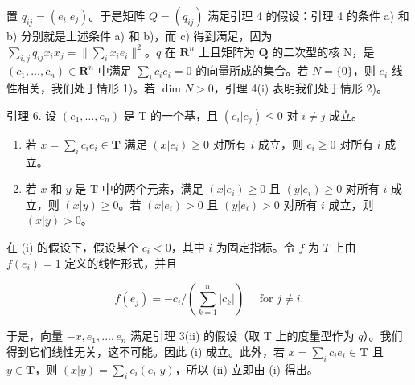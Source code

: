 置 \(q_{ij} = (e_i|e_j)\)。于是矩阵 \(Q = (q_{ij})\) 满足引理 4 的假设：引理 4 的条件 a) 和 b) 分别就是上述条件 a) 和 b)，而 c) 得到满足，因为 \(\sum_{i,j} q_{ij} x_i x_j = \|\sum_{i} x_i e_i\|^2\)。\(q\) 在 \(\mathbf{R}^n\) 上且矩阵为 \(\mathbf{Q}\) 的二次型的核 N，是 \((c_1, \ldots, c_n) \in \mathbf{R}^n\) 中满足 \(\sum_{i} c_i e_i = 0\) 的向量所成的集合。若 \(N = \{0\}\)，则 \(e_i\) 线性相关，我们处于情形 1)。若 \(\dim N > 0\)，引理 4(i) 表明我们处于情形 2)。

引理 6. 设 \((e_1, \ldots, e_n)\) 是 T 的一个基，且 \((e_i | e_j) \leqslant 0\) 对 \(i \neq j\) 成立。

\begin{enumerate}
\def\labelenumi{(\roman{enumi})}
\item
若 \(x = \sum_{i} c_i e_i \in \mathbf{T}\) 满足 \((x|e_i) \geqslant 0\) 对所有 \(i\) 成立，则 \(c_i \geqslant 0\) 对所有 \(i\) 成立。
\item
若 \(x\) 和 \(y\) 是 \(\mathrm{T}\) 中的两个元素，满足 \((x|e_i) \geqslant 0\) 且 \((y|e_i) \geqslant 0\) 对所有 \(i\) 成立，则 \((x|y) \geqslant 0\)。若 \((x|e_i) > 0\) 且 \((y|e_i) > 0\) 对所有 \(i\) 成立，则 \((x|y) > 0\)。
\end{enumerate}

在 (i) 的假设下，假设某个 \(c_{i} < 0\)，其中 \(i\) 为固定指标。令 \(f\) 为 \(T\) 上由 \(f(e_{i}) = 1\) 定义的线性形式，并且

\[
f \left(e _ {j}\right) = - c _ {i} / \left(\sum_ {k = 1} ^ {n} \left| c _ {k} \right|\right) \quad \text { for } j \neq i.
\]

于是，向量 \(-x, e_1, \ldots, e_n\) 满足引理 3(ii) 的假设（取 T 上的度量型作为 \(q\)）。我们得到它们线性无关，这不可能。因此 (i) 成立。此外，若 \(x = \sum_{i} c_i e_i \in \mathbf{T}\) 且 \(y \in \mathbf{T}\)，则 \((x|y) = \sum_{i} c_i (e_i | y)\)，所以 (ii) 立即由 (i) 得出。

